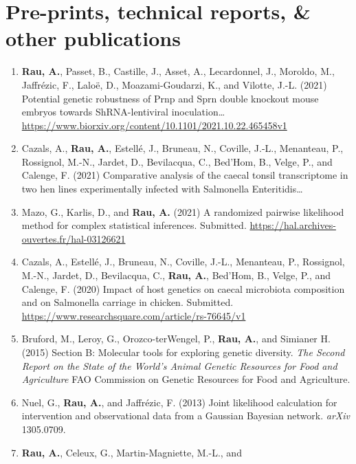 \documentclass[11pt, a4paper]{awesome-cv}
\providecommand{\tightlist}{%
	\setlength{\itemsep}{0pt}\setlength{\parskip}{0pt}}
\begin{document}
\hypertarget{pre-prints-technical-reports-other-publications}{%
\section{Pre-prints, technical reports, \& other
publications}\label{pre-prints-technical-reports-other-publications}}

\begin{enumerate}
\def\labelenumi{\arabic{enumi}.}
\tightlist
\item
  \textbf{Rau, A.}, Passet, B., Castille, J., Asset, A., Lecardonnel,
  J., Moroldo, M., Jaffrézic, F., Laloë, D., Moazami-Goudarzi, K., and
  Vilotte, J.-L. (2021) Potential genetic robustness of Prnp and Sprn
  double knockout mouse embryos towards ShRNA-lentiviral
  inoculation\ldots{}
  \url{https://www.biorxiv.org/content/10.1101/2021.10.22.465458v1}
\item
  Cazals, A., \textbf{Rau, A.}, Estellé, J., Bruneau, N., Coville,
  J.-L., Menanteau, P., Rossignol, M.-N., Jardet, D., Bevilacqua, C.,
  Bed'Hom, B., Velge, P., and Calenge, F. (2021) Comparative analysis of
  the caecal tonsil transcriptome in two hen lines experimentally
  infected with Salmonella Enteritidis\ldots{}
\item
  Mazo, G., Karlis, D., and \textbf{Rau, A.} (2021) A randomized
  pairwise likelihood method for complex statistical inferences.
  Submitted. \url{https://hal.archives-ouvertes.fr/hal-03126621}
\item
  Cazals, A., Estellé, J., Bruneau, N., Coville, J.-L., Menanteau, P.,
  Rossignol, M.-N., Jardet, D., Bevilacqua, C., \textbf{Rau, A.},
  Bed'Hom, B., Velge, P., and Calenge, F. (2020) Impact of host genetics
  on caecal microbiota composition and on Salmonella carriage in
  chicken. Submitted.
  \url{https://www.researchsquare.com/article/rs-76645/v1}
\item
  Bruford, M., Leroy, G., Orozco-terWengel, P., \textbf{Rau, A.}, and
  Simianer H. (2015) Section B: Molecular tools for exploring genetic
  diversity. \emph{The Second Report on the State of the World's Animal
  Genetic Resources for Food and Agriculture} FAO Commission on Genetic
  Resources for Food and Agriculture.
\item
  Nuel, G., \textbf{Rau, A.}, and Jaffrézic, F. (2013) Joint likelihood
  calculation for intervention and observational data from a Gaussian
  Bayesian network. \emph{arXiv} 1305.0709.
\item
  \textbf{Rau, A.}, Celeux, G., Martin-Magniette, M.-L., and

\end{enumerate}
\end{document}
